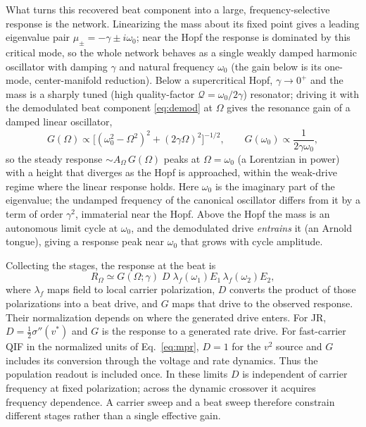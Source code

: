 \documentclass[11pt,a4paper]{article}
\newcommand{\Sig}{\sigma}
\newcommand{\half}{\tfrac{1}{2}}
\begin{document}
What turns this recovered beat component into a large, frequency-selective response is
the network. Linearizing the mass about its fixed point gives a leading eigenvalue pair
$\mu_\pm=-\gamma\pm i\omega_0$; near the Hopf the response is dominated by this critical
mode, so the whole network behaves as a single weakly damped harmonic oscillator with
damping $\gamma$ and natural frequency $\omega_0$ (the gain below is its one-mode,
center-manifold reduction). Below a supercritical Hopf, $\gamma\to0^+$ and
the mass is a sharply tuned (high quality-factor $\mathcal{Q}=\omega_0/2\gamma$) resonator;
driving it with the demodulated beat component
\eqref{eq:demod} at $\Omega$ gives the resonance gain of a damped linear oscillator,
\begin{equation}
G(\Omega)\propto\big[(\omega_0^2-\Omega^2)^2+(2\gamma\Omega)^2\big]^{-1/2},
\qquad G(\omega_0)\propto\frac{1}{2\gamma\omega_0},
\label{eq:gain}
\end{equation}
so the steady response $\sim A_\Omega\,G(\Omega)$ peaks at $\Omega=\omega_0$ (a
Lorentzian in power) with a height that diverges as the Hopf is approached, within the
weak-drive regime where the linear response holds. Here $\omega_0$ is the imaginary part of
the eigenvalue; the undamped frequency of the canonical oscillator differs from it by a
term of order $\gamma^2$, immaterial near the Hopf. Above the
Hopf the mass is an autonomous limit cycle at $\omega_0$, and the demodulated drive
\emph{entrains} it (an Arnold tongue), giving a response peak near $\omega_0$ that
grows with cycle amplitude.

Collecting the stages, the response at the beat is
\begin{equation}
R_\Omega\simeq G(\Omega;\gamma)\;D\;\lambda_f(\omega_1)E_1\,\lambda_f(\omega_2)E_2 ,
\label{eq:receiver}
\end{equation}
where $\lambda_f$ maps field to local carrier polarization, $D$ converts the
product of those polarizations into a beat drive, and $G$ maps that drive to the
observed response. Their normalization depends on where the generated drive enters.
For JR, $D=\half\Sig''(v^*)$ and $G$ is the response to a generated rate drive.
For fast-carrier QIF in the normalized units of Eq.~\eqref{eq:mpr}, $D=1$ for
the $v^2$ source and $G$ includes its conversion through the voltage and rate
dynamics. Thus the population readout is included once. In these limits $D$ is
independent of carrier frequency at fixed polarization; across the dynamic
crossover it acquires frequency dependence. A carrier sweep and a beat sweep
therefore constrain different stages rather than a single effective gain.
\end{document}
